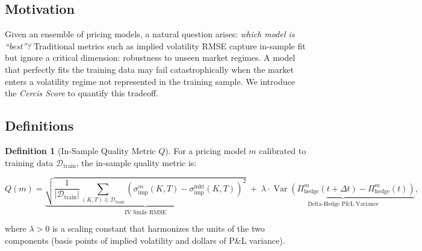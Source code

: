 \documentclass[11pt,a4paper]{article}
\theoremstyle{plain}
\theoremstyle{definition}
\newtheorem{definition}[theorem]{Definition}
\theoremstyle{remark}
\newcommand{\Var}{\operatorname{Var}}
\begin{document}
\subsection{Motivation}

Given an ensemble of pricing models, a natural question arises: \emph{which model is ``best''?} Traditional metrics such as implied volatility RMSE capture in-sample fit but ignore a critical dimension: robustness to unseen market regimes. A model that perfectly fits the training data may fail catastrophically when the market enters a volatility regime not represented in the training sample. We introduce the \emph{Cercis Score} to quantify this tradeoff.

\subsection{Definitions}

\begin{definition}[In-Sample Quality Metric $Q$]\label{def:Q}
For a pricing model $m$ calibrated to training data $\mathcal{D}_{\text{train}}$, the in-sample quality metric is:

\begin{equation}\label{eq:Q_def}
  Q(m) = \underbrace{\sqrt{\frac{1}{|\mathcal{D}_{\text{train}}|}\sum_{(K,T) \in \mathcal{D}_{\text{train}}} \left(\sigma_{\text{imp}}^m(K,T) - \sigma_{\text{imp}}^{\text{mkt}}(K,T)\right)^2}}_{\text{IV Smile RMSE}}
  \;+\;
  \lambda \cdot \underbrace{\Var\!\left(\Pi_{\text{hedge}}^m(t + \Delta t) - \Pi_{\text{hedge}}^m(t)\right)}_{\text{Delta-Hedge P\&L Variance}},
\end{equation}

where $\lambda > 0$ is a scaling constant that harmonizes the units of the two components (basis points of implied volatility and dollars of P\&L variance).
\end{definition}
\end{document}
